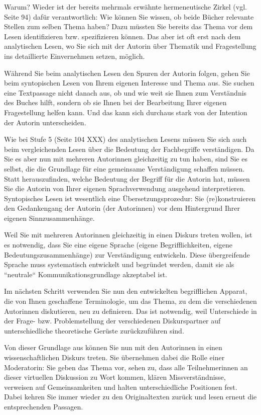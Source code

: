 \documentclass[]{book}
\theoremstyle{definition}
\theoremstyle{definition}
\theoremstyle{definition}
\theoremstyle{remark}
\begin{document}
Warum? Wieder ist der bereits mehrmals erwähnte hermeneutische Zirkel
(vgl. Seite 94) dafür verantwortlich: Wie können Sie wissen, ob beide
Bücher relevante Stellen zum selben Thema haben? Dazu müssten Sie
bereits das Thema vor dem Lesen identifizieren bzw. spezifizieren
können. Das aber ist oft erst nach dem analytischen Lesen, wo Sie sich
mit der Autorin über Thematik und Fragestellung ins detaillierte
Einvernehmen setzen, möglich.

Während Sie beim analytischen Lesen den Spuren der Autorin folgen, gehen
Sie beim syntopischen Lesen von Ihrem eigenen Interesse und Thema aus.
Sie suchen eine Textpassage nicht danach aus, ob und wie weit sie Ihnen
zum Verständnis des Buches hilft, sondern ob sie Ihnen bei der
Bearbeitung Ihrer eigenen Fragestellung helfen kann. Und das kann sich
durchaus stark von der Intention der Autorin unterscheiden.

Wie bei Stufe 5 (Seite 104 XXX) des analytischen Lesens müssen Sie sich
auch beim vergleichenden Lesen über die Bedeutung der Fachbegriffe
verständigen. Da Sie es aber nun mit mehreren Autorinnen gleichzeitig zu
tun haben, sind Sie es selbst, die die Grundlage für eine gemeinsame
Verständigung schaffen müssen. Statt herauszufinden, welche Bedeutung
der Begriff für die Autorin hat, müssen Sie die Autorin von Ihrer
eigenen Sprachverwendung ausgehend interpretieren. Syntopisches Lesen
ist wesentlich eine Übersetzungsprozedur: Sie (re)konstruieren den
Gedankengang der Autorin (der Autorinnen) vor dem Hintergrund Ihrer
eigenen Sinnzusammenhänge.

Weil Sie mit mehreren Autorinnen gleichzeitig in einen Diskurs treten
wollen, ist es notwendig, dass Sie eine eigene Sprache (eigene
Begrifflichkeiten, eigene Bedeutungszusammenhänge) zur Verständigung
entwickeln. Diese übergreifende Sprache muss systematisch entwickelt und
begründet werden, damit sie als ``neutrale`` Kommunikationsgrundlage
akzeptabel ist.

Im nächsten Schritt verwenden Sie nun den entwickelten begrifflichen
Apparat, die von Ihnen geschaffene Terminologie, um das Thema, zu dem
die verschiedenen Autorinnen diskutieren, neu zu definieren. Das ist
notwendig, weil Unterschiede in der Frage- bzw. Problemstellung der
verschiedenen Diskurspartner auf unterschiedliche theoretische Gerüste
zurückzuführen sind.

Von dieser Grundlage aus können Sie nun mit den Autorinnen in einen
wissenschaftlichen Diskurs treten. Sie übernehmen dabei die Rolle einer
Moderatorin: Sie geben das Thema vor, sehen zu, dass alle
Teilnehmerinnen an dieser virtuellen Diskussion zu Wort kommen, klären
Missverständnisse, verweisen auf Gemeinsamkeiten und halten
unterschiedliche Positionen fest. Dabei kehren Sie immer wieder zu den
Originaltexten zurück und lesen erneut die entsprechenden Passagen.
\end{document}

